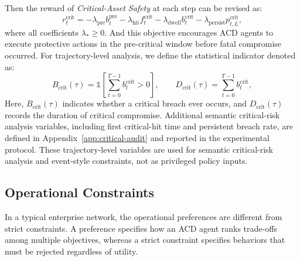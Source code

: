 \documentclass[sigconf,review,anonymous]{acmart}
\begin{document}
Then the reward of \emph{Critical-Asset Safety} at each step can be revised as:
\begin{equation}
r_t^{\mathrm{crit}}
=
-
\lambda_{\mathrm{pre}} b_t^{\mathrm{pre}}
-
\lambda_{\mathrm{hit}} f_t^{\mathrm{crit}}
-
\lambda_{\mathrm{dwell}} b_t^{\mathrm{crit}}
-
\lambda_{\mathrm{persist}} p_{t,L}^{\mathrm{crit}},
\label{eq:crit-reward}
\end{equation}
where all coefficients \(\lambda_{\mathrm{*}} \geq 0\). And this objective encourages ACD agents to execute protective actions in the pre-critical window before fatal compromise occurred.
For trajectory-level analysis, we define the statistical indicator denoted as:
\begin{equation}
B_{\mathrm{crit}}(\tau)
=
\mathbb{1}
\!\left[
\sum_{t=0}^{T-1}
b_t^{\mathrm{crit}}>0
\right],
\qquad
D_{\mathrm{crit}}(\tau)
=
\sum_{t=0}^{T-1}
b_t^{\mathrm{crit}},
\label{eq:crit-audit-summary}
\end{equation}
Here, \(B_{\mathrm{crit}}(\tau)\) indicates whether a critical breach
ever occurs, and \(D_{\mathrm{crit}}(\tau)\) records the duration of
critical compromise. Additional semantic critical-risk analysis variables,
including first critical-hit time and persistent breach rate, are defined
in Appendix~\ref{app:critical-audit} and reported in the experimental
protocol. These trajectory-level variables are used for semantic
critical-risk analysis and event-style constraints, not as privileged
policy inputs.

\subsection{Operational Constraints}
\label{subsec:constraints}

In a typical enterprise network, the operational preferences are different from strict constraints.
A preference specifies how an ACD agent ranks trade-offs among multiple objectives, whereas a strict constraint specifies behaviors that must be rejected regardless of utility.
\end{document}
